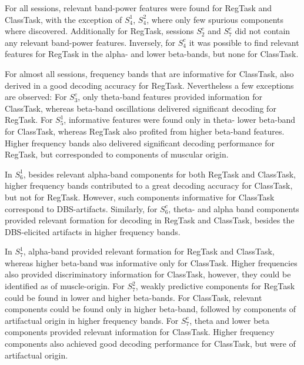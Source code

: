 \documentclass[10pt,a4paper, twocolumn]{article}
\newcommand{\patient}[2]{$S_{#1}^{#2}$}
\newcommand{\regtask}{RegTask\xspace}
\newcommand{\classtask}{ClassTask\xspace}
\begin{document}
For all sessions, relevant band-power features were found for \regtask and  \classtask, with the exception of \patient{4}{1}, \patient{4}{2}, where only few spurious components where discovered. Additionally for \regtask, sessions  \patient{2}{c} and \patient{7}{c} did not contain any relevant band-power features. Inversely, for \patient{4}{c} it was possible to find relevant features for \regtask in the alpha- and lower beta-bands, but none for \classtask.
 
For almost all sessions, frequency bands that are informative for \classtask, also derived in a good decoding accuracy for \regtask. Nevertheless a few exceptions are observed: For \patient{3}{c}, only theta-band features provided information for \classtask, whereas beta-band oscillations delivered significant decoding for \regtask. For \patient{5}{1}, informative features were found only in theta- lower beta-band for \classtask, whereas \regtask also profited from higher beta-band features. Higher frequency bands also delivered significant decoding performance for \regtask, but corresponded to components of muscular origin.

In \patient{6}{1}, besides relevant alpha-band components for both \regtask and \classtask, higher frequency bands contributed to a great decoding accuracy for \classtask, but not for \regtask. However, such components informative for \classtask correspond to DBS-artifacts. Similarly, for \patient{6}{c}, theta- and alpha band components provided relevant formation for decoding in \regtask and  \classtask, besides the DBS-elicited artifacts in higher frequency bands.

In \patient{7}{1}, alpha-band provided relevant formation for \regtask and \classtask, whereas higher beta-band was informative only for \classtask. Higher frequencies also provided discriminatory information for \classtask, however, they could be identified as of muscle-origin. For \patient{7}{2}, weakly predictive components for \regtask could be found in lower and higher beta-bands. For \classtask, relevant components could be found only in higher beta-band, followed by components of artifactual origin in higher frequency bands. For \patient{7}{c}, theta and lower beta components provided relevant information for \classtask. Higher frequency components also achieved good decoding performance for \classtask, but were of artifactual origin.
\end{document}
